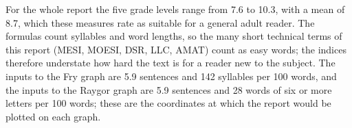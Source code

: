 For the whole report the five grade levels range from 7.6
to 10.3, with a mean of 8.7, which these measures rate as suitable for a general adult reader.
The formulas count syllables and word lengths, so the many short technical terms of
this report (MESI, MOESI, DSR, LLC, AMAT) count as easy words; the indices therefore
understate how hard the text is for a reader new to the subject. The inputs to the
Fry graph are 5.9 sentences and 142 syllables per 100 words, and the inputs to the
Raygor graph are 5.9 sentences and 28 words of six or more letters per 100 words;
these are the coordinates at which the report would be plotted on each graph.
